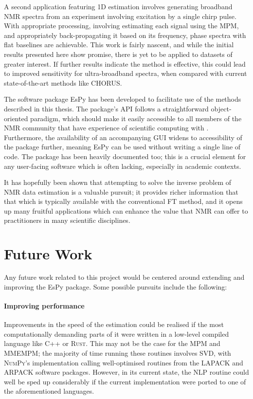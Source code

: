 A second application featuring \ac{1D} estimation involves generating broadband
\ac{NMR} spectra from an experiment involving excitation by a single chirp
pulse. With appropriate processing, involving estimating each signal using the
\ac{MPM}, and appropriately back-propagating it based on its frequency, phase
spectra with flat baselines are achievable.
This work is fairly nascent, and while the initial results presented here show
promise, there is yet to be applied to datasets of greater interest. If
further results indicate the method is effective, this could lead to improved
sensitivity for ultra-broadband spectra, when compared with current
state-of-the-art methods like \ac{CHORUS}.

The software package \ac{EsPy} has been developed to facilitate use of the methods
described in this thesis. The package's \ac{API} follows a straightforward
object-oriented paradigm, which should make it easily accessible to all
members of the \ac{NMR} community that have experience of scientific
computing with \Python\!. Furthermore, the availability of an accompanying \ac{GUI}
widens to accessibility of the package further, meaning \ac{EsPy} can be used
without writing a single line of code. The package has been heavily documented
too; this is a crucial element for any user-facing software which is often
lacking, especially in academic contexts.

It has hopefully been shown that attempting to solve the inverse problem of
\ac{NMR} data estimation is a valuable pursuit; it provides richer information
that that which is typically available with the conventional \ac{FT} method,
and it opens up many fruitful applications which can enhance the value that
\ac{NMR} can offer to practitioners in many scientific disciplines.


\section{Future Work}
\label{sec:future-work}
Any future work related to this project would be centered around extending and
improving the \ac{EsPy} package. Some possible pursuits include the following:

\paragraph{Improving performance}
Improvements in the speed of the estimation
could be realised if the most computationally demanding parts of it were
written in a low-level compiled language like C++ or \textsc{Rust}. This may not
be the case for the \ac{MPM} and \ac{MMEMPM}; the majority of time running
these routines involves \ac{SVD}, with \textsc{NumPy}'s implementation calling
well-optimised routines from the \textsc{LAPACK} and \textsc{ARPACK} software
packages. However, in its current state, the \ac{NLP} routine could well be
sped up considerably if the current \Python implementation were ported to one
of the aforementioned languages.

